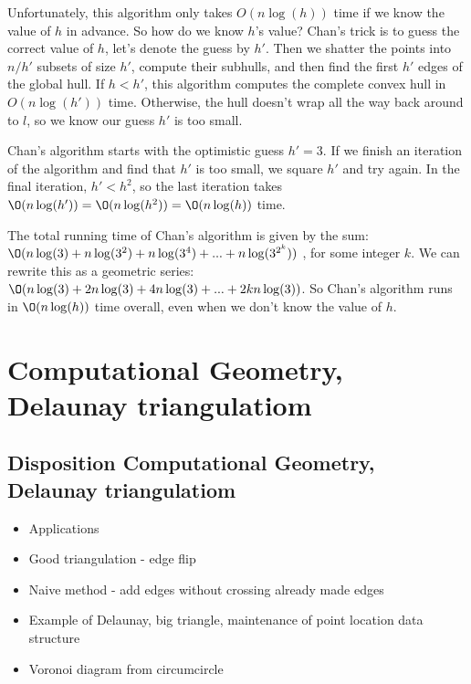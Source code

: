 \documentclass[10pt]{article}
\begin{document}
Unfortunately, this algorithm only takes $O(n\log(h))$ time if we know the value of $h$ in advance. So how do we know $h$'s value? Chan's trick is to guess the correct value of $h$, let's denote the guess by $h'$. Then we shatter the points into $n/h'$ subsets of size $h'$, compute their subhulls, and then find the first $h'$ edges of the global hull. If $h < h'$, this algorithm computes the complete convex hull in $O(n\log(h'))$ time. Otherwise, the hull doesn't wrap all the way back around to $l$, so we know our guess $h'$ is too small.

Chan's algorithm starts with the optimistic guess $h' = 3$. If we finish an iteration of the algorithm and find that $h'$ is too small, we square $h'$ and try again. In the final iteration, $h'<h^2$, so the last iteration takes $\O(n\log(h')) = \O(n\log(h^2)) = \O(n\log(h))$ time.

The total running time of Chan's algorithm is given by the sum: $\O(n\log(3) + n\log(3^2) + n\log(3^4) + ... + n\log(3^{2^k}))$ , for some integer $k$. We can rewrite this as a geometric series: $\O(n\log(3) + 2n\log(3) + 4n\log(3) + ... + 2kn\log(3))$. So Chan's algorithm runs in $\O(n\log(h))$ time overall, even when we don't know the value of $h$.




\clearpage \newpage
\section{Computational Geometry, Delaunay triangulatiom} %
\label{sec:computational_geometry_delaunay_triangulatiom}

\subsection{Disposition Computational Geometry, Delaunay triangulatiom} %
\label{sub:disposition8}
\begin{itemize}
  \item Applications
  \item Good triangulation - edge flip
  \item Naive method - add edges without crossing already made edges
  \item Example of Delaunay, big triangle, maintenance of point location data structure
  \item Voronoi diagram from circumcircle 
\end{itemize}
\newpage
\end{document}
